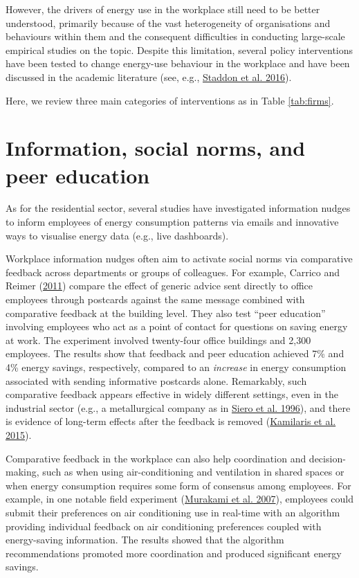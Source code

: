 \documentclass[
  11pt,
  captions=heading]{scrreport}
\begin{document}
However, the drivers of energy use in the workplace still need to be
better understood, primarily because of the vast heterogeneity of
organisations and behaviours within them and the consequent difficulties
in conducting large-scale empirical studies on the topic. Despite this
limitation, several policy interventions have been tested to change
energy-use behaviour in the workplace and have been discussed in the
academic literature (see, e.g.,
\protect\hyperlink{ref-staddon2016intervening}{Staddon et al. 2016}).

Here, we review three main categories of interventions as in Table
\ref{tab:firms}.

\hypertarget{information-social-norms-and-peer-education}{%
\section{Information, social norms, and peer
education}\label{information-social-norms-and-peer-education}}

As for the residential sector, several studies have investigated
information nudges to inform employees of energy consumption patterns
via emails and innovative ways to visualise energy data (e.g., live
dashboards).

Workplace information nudges often aim to activate social norms via
comparative feedback across departments or groups of colleagues. For
example, Carrico and Reimer
(\protect\hyperlink{ref-carrico2011motivating}{2011}) compare the effect
of generic advice sent directly to office employees through postcards
against the same message combined with comparative feedback at the
building level. They also test ``peer education'' involving employees
who act as a point of contact for questions on saving energy at work.
The experiment involved twenty-four office buildings and 2,300
employees. The results show that feedback and peer education achieved
7\% and 4\% energy savings, respectively, compared to an \emph{increase}
in energy consumption associated with sending informative postcards
alone. Remarkably, such comparative feedback appears effective in widely
different settings, even in the industrial sector (e.g., a metallurgical
company as in \protect\hyperlink{ref-siero1996changing}{Siero et al.
1996}), and there is evidence of long-term effects after the feedback is
removed (\protect\hyperlink{ref-kamilaris2015case}{Kamilaris et al.
2015}).

Comparative feedback in the workplace can also help coordination and
decision-making, such as when using air-conditioning and ventilation in
shared spaces or when energy consumption requires some form of consensus
among employees. For example, in one notable field experiment
(\protect\hyperlink{ref-murakami2007field}{Murakami et al. 2007}),
employees could submit their preferences on air conditioning use in
real-time with an algorithm providing individual feedback on air
conditioning preferences coupled with energy-saving information. The
results showed that the algorithm recommendations promoted more
coordination and produced significant energy savings.
\end{document}
